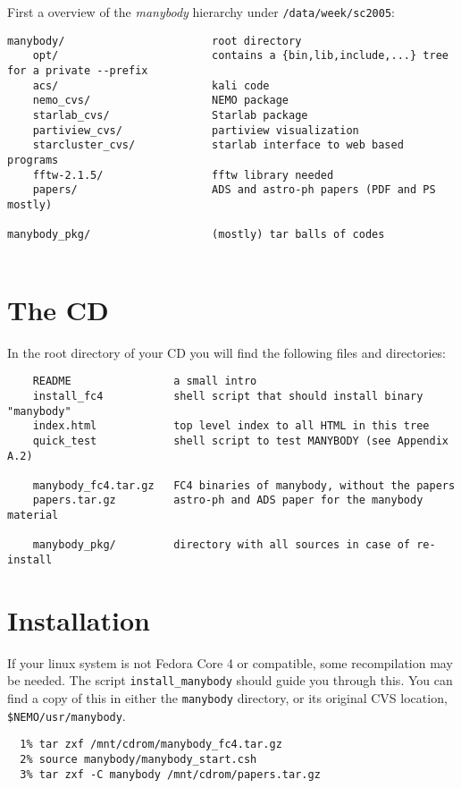 First a overview of the {\it manybody} hierarchy under {\tt /data/week/sc2005}:

\begin{verbatim}
manybody/                       root directory
    opt/                        contains a {bin,lib,include,...} tree for a private --prefix
    acs/                        kali code
    nemo_cvs/                   NEMO package
    starlab_cvs/                Starlab package
    partiview_cvs/              partiview visualization 
    starcluster_cvs/            starlab interface to web based programs
    fftw-2.1.5/                 fftw library needed 
    papers/                     ADS and astro-ph papers (PDF and PS mostly)

manybody_pkg/                   (mostly) tar balls of codes 
    
\end{verbatim}



\section{The CD}
In the root directory of your CD you will find the following files and directories:

\begin{verbatim}
    README                a small intro
    install_fc4           shell script that should install binary "manybody"
    index.html            top level index to all HTML in this tree
    quick_test            shell script to test MANYBODY (see Appendix A.2)

    manybody_fc4.tar.gz   FC4 binaries of manybody, without the papers
    papers.tar.gz         astro-ph and ADS paper for the manybody material

    manybody_pkg/         directory with all sources in case of re-install
\end{verbatim}

\section{Installation}

If your linux system is not Fedora Core 4
or compatible, some recompilation may be needed. The script
{\tt install\_manybody} should guide you through this. You can find a copy
of this in either the {\tt manybody} directory, or its original CVS location,
{\tt \$NEMO/usr/manybody}.

\footnotesize\begin{verbatim}
  1% tar zxf /mnt/cdrom/manybody_fc4.tar.gz
  2% source manybody/manybody_start.csh
  3% tar zxf -C manybody /mnt/cdrom/papers.tar.gz

\end{verbatim}\normalsize

